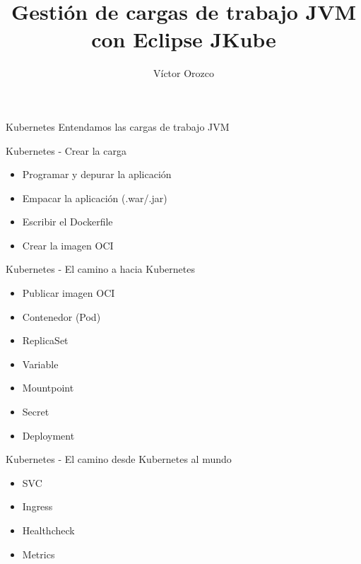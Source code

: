 \documentclass[aspectratio=169]{beamer}
\title{Gestión de cargas de trabajo JVM con Eclipse JKube}
\author{Víctor Orozco}
\institute{GuateJUG}
\date{}
\begin{document}
{
    \frame{\titlepage}
}


\begin{frame}{Kubernetes}
\Large Entendamos las cargas de trabajo JVM
\end{frame}

\begin{frame}{Kubernetes - Crear la carga}

\begin{itemize}
\item Programar y depurar la aplicación
\item Empacar la aplicación (.war/.jar)
\item Escribir el Dockerfile
\item Crear la imagen OCI
\end{itemize}

\end{frame}

\begin{frame}{Kubernetes - El camino a hacia Kubernetes}
\begin{itemize}
\item Publicar imagen OCI
\item Contenedor (Pod)
\item ReplicaSet
\item Variable
\item Mountpoint
\item Secret
\item Deployment
\end{itemize}
\end{frame}


\begin{frame}{Kubernetes - El camino desde Kubernetes al mundo}
\begin{itemize}
\item SVC
\item Ingress
\item Healthcheck
\item Metrics
\end{itemize}
\end{frame}
\end{document}
